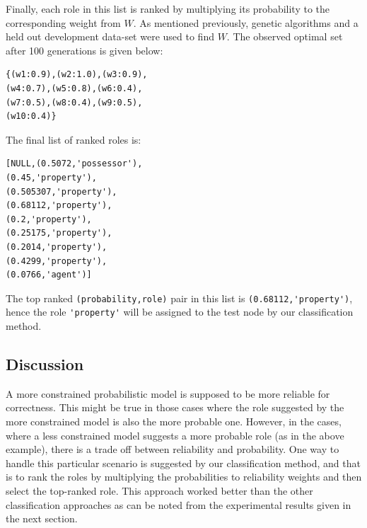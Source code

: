 Finally, each role in this list is ranked by multiplying its probability to the corresponding weight from $W$. As mentioned previously, genetic algorithms and a held out development data-set were used to find $W$. The observed optimal set after 100 generations is given below:
\begin{verbatim}
{(w1:0.9),(w2:1.0),(w3:0.9),
(w4:0.7),(w5:0.8),(w6:0.4),
(w7:0.5),(w8:0.4),(w9:0.5),
(w10:0.4)} 
\end{verbatim}
The final list of ranked roles is:
\begin{verbatim}
[NULL,(0.5072,'possessor'),
(0.45,'property'),
(0.505307,'property'),
(0.68112,'property'),
(0.2,'property'),
(0.25175,'property'),
(0.2014,'property'),
(0.4299,'property'),
(0.0766,'agent')]
\end{verbatim}
The top ranked \verb+(probability,role)+ pair in this list is \verb+(0.68112,'property')+, hence the role \verb+'property'+ will be assigned to the test node by our classification method.\\
\subsection{Discussion}
A more constrained probabilistic model is supposed to be more reliable for correctness. This might be true in those cases where the role suggested by the more constrained model is also the more probable one. However, in the cases, where a less constrained model suggests a more probable role (as in the above example), there is a trade off between reliability and probability. One way to handle this particular scenario is suggested by our classification method, and that is to rank the roles by multiplying the probabilities to reliability weights and then select the top-ranked role. This approach worked better than the other classification approaches as can be noted from  the experimental results given in the next section.

